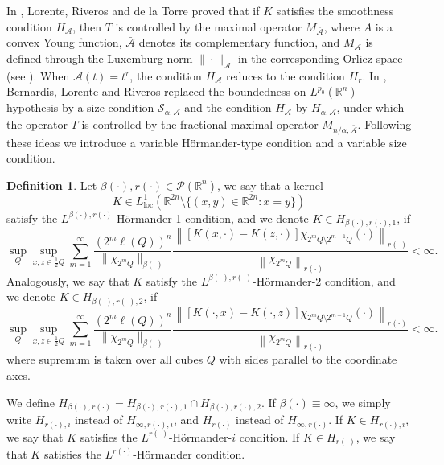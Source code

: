 \documentclass[a4paper,11pt,reqno]{amsart}
\theoremstyle{plain}
\numberwithin{equation}{section}
\theoremstyle{definition}
\newtheorem{defi}[teo]{Definition}
\newcommand{\R}{{\mathbb{R}^n}}
\begin{document}
In \cite{H_A}, Lorente, Riveros and de la Torre proved that if $K$ satisfies the smoothness condition $H_\mathscr{A}$, then $T$ is controlled by the maximal operator $M_{\bar{\mathscr{A}}}$, where $A$ is a convex Young function, $\bar{\mathscr{A}}$ denotes its complementary function, and $M_\mathscr{A}$ is defined through the Luxemburg norm $\|\cdot\|_\mathscr{A}$ in the corresponding Orlicz space (see \cite{Oneil}). When $\mathscr{A}(t)=t^r$, the condition $H_\mathscr{A}$ reduces to the condition $H_r$. In \cite{S_A}, Bernardis, Lorente and Riveros replaced the boundedness on $L^{p_0}(\R)$ hypothesis by a size condition $\mathcal{S}_{\alpha, \mathscr{A}}$ and the condition $H_\mathscr{A}$ by $H_{\alpha,\mathscr{A}}$, under which the operator $T$ is controlled by the fractional maximal operator $M_{n/\alpha,\bar{\mathscr{A}}}$. Following these ideas we introduce a variable Hörmander-type condition and a variable size condition.
\begin{defi}\label{def Hör}
	Let $\beta(\cdot),r(\cdot)\in\mathcal{P}(\R)$, we say that a kernel $$K\in L^1_{\text{loc}}\left(\mathbb{R}^{2n} \setminus \{(x,y)\in\mathbb{R}^{2n} : x=y\}\right)$$ satisfy the
	$L^{\beta(\cdot),r(\cdot)}$-Hörmander-1 condition, and we denote $K \in
	H_{\beta(\cdot),r(\cdot),1}$, if 
	\begin{equation*} 
	\underset{Q}{\sup}\underset{x,z\in \frac{1}{2}Q}{\sup}\sum_{m=1}^{\infty} \frac{(2^m\ell(Q))^{n}}{\|\chi_{2^m Q}\|_{\beta(\cdot)}} \frac{\left\| \left[K(x,\cdot) - K(z,\cdot)\right]\chi_{2^mQ\setminus2^{m-1}Q}(\cdot)\right\|_{r(\cdot)}}{\left\|\chi_{2^m Q}\right\|_{r(\cdot)}} <\infty. 
	\end{equation*}
	Analogously, we say that $K$ satisfy the
	$L^{\beta(\cdot),r(\cdot)}$-Hörmander-2 condition, and we denote $K \in
	H_{\beta(\cdot),r(\cdot),2}$, if
	\begin{equation*} 
	\underset{Q}{\sup}\underset{x,z\in \frac{1}{2}Q}{\sup}\sum_{m=1}^{\infty} \frac{(2^m\ell(Q))^{n}}{\|\chi_{2^m Q}\|_{\beta(\cdot)}} \frac{\left\| \left[K(\cdot,x) - K(\cdot,z)\right]\chi_{2^mQ\setminus2^{m-1}Q}(\cdot)\right\|_{r(\cdot)}}{\left\|\chi_{2^m Q}\right\|_{r(\cdot)}} <\infty.
	\end{equation*}
	where supremum is taken over all cubes $Q$ with sides parallel to the coordinate axes. 
	
	We define $H_{\beta(\cdot),r(\cdot)}=H_{\beta(\cdot),r(\cdot),1}\cap H_{\beta(\cdot),r(\cdot),2}$. If $\beta(\cdot)\equiv\infty$, we simply write $H_{r(\cdot),i}$ instead of $H_{\infty,r(\cdot),i}$, and $H_{r(\cdot)}$ instead of $H_{\infty,r(\cdot)}$. If $K\in H_{r(\cdot),i}$, we say that $K$ satisfies the $L^{r(\cdot)}$-Hörmander-$i$ condition. If $K\in H_{r(\cdot)}$, we say that $K$ satisfies the $L^{r(\cdot)}$-Hörmander condition.  
\end{defi}
\end{document}
